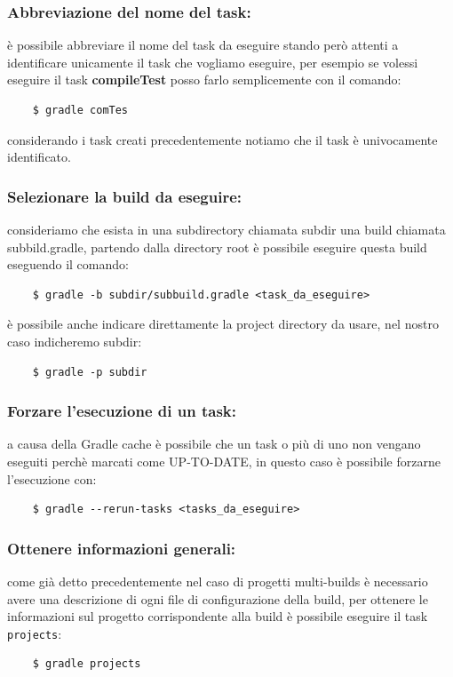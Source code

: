 \documentclass{article}
\begin{document}
\begin{flushleft}
\subsubsection{Abbreviazione del nome del task:} è possibile abbreviare il nome del task da eseguire stando però attenti a identificare unicamente il task che vogliamo eseguire, per esempio se volessi eseguire il task \textbf{compileTest} posso farlo semplicemente con il comando:
    \begin{verbatim}
    $ gradle comTes
    \end{verbatim}
    considerando i task creati precedentemente notiamo che il task è univocamente identificato.

\subsubsection{Selezionare la build da eseguire:} consideriamo che esista in una subdirectory chiamata subdir una build chiamata subbild.gradle, partendo dalla directory root è possibile eseguire questa build eseguendo il comando:
    \begin{verbatim}
    $ gradle -b subdir/subbuild.gradle <task_da_eseguire>
    \end{verbatim}
    è possibile anche indicare direttamente la project directory da usare, nel nostro caso indicheremo subdir:
    \begin{verbatim}
    $ gradle -p subdir
    \end{verbatim}

\subsubsection{Forzare l'esecuzione di un task:} a causa della Gradle cache è possibile che un task o più di uno non vengano eseguiti perchè marcati come UP-TO-DATE, in questo caso è possibile forzarne l'esecuzione con:
    \begin{verbatim}
    $ gradle --rerun-tasks <tasks_da_eseguire>
    \end{verbatim}

\subsubsection{Ottenere informazioni generali:} come già detto precedentemente nel caso di progetti multi-builds è necessario avere una descrizione di ogni file di configurazione della build, per ottenere le informazioni sul progetto corrispondente alla build è possibile eseguire il task \texttt{projects}:
    \begin{verbatim}
    $ gradle projects
    \end{verbatim}


\end{flushleft}
\end{document}
